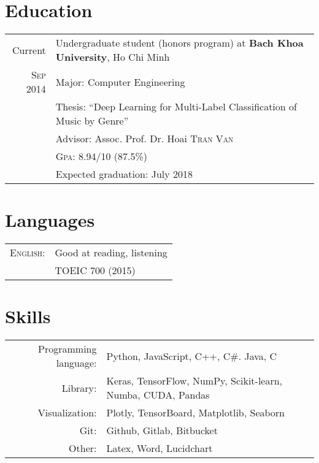 \documentclass[a4paper,10pt]{article}
\begin{document}
\begin{tabular}{r|p{11cm}}
\end{tabular}
\section{Education}
\begin{tabular}{r|l}
	Current           & Undergraduate student (honors program) at \textbf{Bach Khoa University}, Ho Chi Minh \\
	\textsc{Sep} 2014 & Major: Computer Engineering                                                              \\
	                  & Thesis: ``Deep Learning for Multi-Label Classification of Music by Genre''
	\\
	                  & \small Advisor: Assoc. Prof. Dr. Hoai \textsc{Tran Van}
	\\
	                  & \normalsize \textsc{Gpa}: 8.94/10 (87.5\%)                                               \\
	                  & Expected graduation: July 2018
\end{tabular}

\section{Languages}
\begin{tabular}{rl}
	\textsc{English:}    & Good at reading, listening \\
	                     & TOEIC 700 (2015)           \\
\end{tabular}

\section{Skills}
\begin{tabular}{rp{11cm}}
	Programming language: & Python, JavaScript, C++, C\#. Java, C \\
	Library: & Keras, TensorFlow, NumPy, Scikit-learn, Numba, CUDA, Pandas \\	
	Visualization: & Plotly, TensorBoard, Matplotlib, Seaborn \\
	Git:        & Github, Gitlab, Bitbucket \\
	Other: 			& Latex, Word, Lucidchart \\
\end{tabular}

\end{document}
